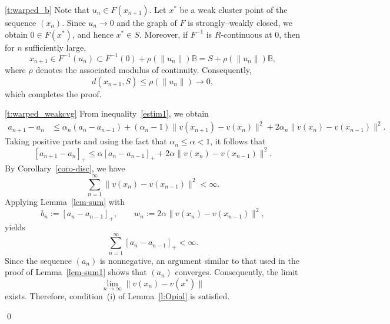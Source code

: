 \documentclass[11pt]{article}
\makeatletter
\renewenvironment{proof}[1][\proofname]{\par
	\normalfont
	\topsep0\p@\@plus3\p@ \trivlist
	\item[\hskip\labelsep\itshape
	#1\@addpunct{.}]\ignorespaces
}{%
	\qed\endtrivlist
}
\theoremstyle{definition}
\theoremstyle{definition}
\theoremstyle{definition}
\newcommand{\tcr}{\textcolor{red}}
\def\tcr{ \textcolor{red}}
\makeatother
\begin{document}
\begin{proof}

\ref{t:warped_b}
{
Note that \(u_n\in F(x_{n+1})\).
Let \(x^*\) be a weak cluster point of the sequence \((x_n)\).
Since \(u_n\to 0\) and the graph of \(F\) is strongly--weakly closed, we obtain
\(0\in F(x^*)\), and hence \(x^*\in S\).
}
{
Moreover, if \(F^{-1}\) is \(R\)-continuous at \(0\), then for \(n\) sufficiently large,
\[
x_{n+1}\in F^{-1}(u_n)
\subset F^{-1}(0)+\rho(\|u_n\|)\mathbb{B}
= S+\rho(\|u_n\|)\mathbb{B},
\]
where \(\rho\) denotes the associated modulus of continuity.
Consequently,
\[
d(x_{n+1},S)\le \rho(\|u_n\|)\to 0,
\]
which completes the proof.
}

\ref{t:warped_weakcvg} 
{
From inequality~\eqref{estim1}, we obtain
\begin{align*}
a_{n+1}-a_n 
&\leq \alpha_n (a_n-a_{n-1})
+(\alpha_n-1)\|v(x_{n+1})-v(x_n)\|^2
+2\alpha_n\|v(x_n)-v(x_{n-1})\|^2.
\end{align*}
Taking positive parts and using the fact that \(\alpha_n\le \alpha<1\), it follows that
\[
[a_{n+1}-a_n]_+
\le \alpha [a_n-a_{n-1}]_+
+2\alpha\|v(x_n)-v(x_{n-1})\|^2.
\]
By Corollary~\ref{coro-disc}, we have
\[
\sum_{n=1}^{\infty}\|v(x_n)-v(x_{n-1})\|^2 < \infty.
\]
Applying Lemma~\ref{lem-sum} with
\[
b_n := [a_n-a_{n-1}]_+, 
\qquad 
w_n := 2\alpha\|v(x_n)-v(x_{n-1})\|^2,
\]
yields
\[
\sum_{n=1}^{\infty}[a_n-a_{n-1}]_+ < \infty.
\]
Since the sequence \((a_n)\) is nonnegative, an argument similar to that used in the proof of Lemma~\ref{lem-sum1} shows that \((a_n)\) converges. Consequently, the limit
\[
\lim_{n\to\infty}\|v(x_n)-v(x^*)\|
\]
exists. Therefore, condition~(i) of Lemma~\ref{l:Opial} is satisfied.
}
\medskip


\end{proof}
\end{document}
